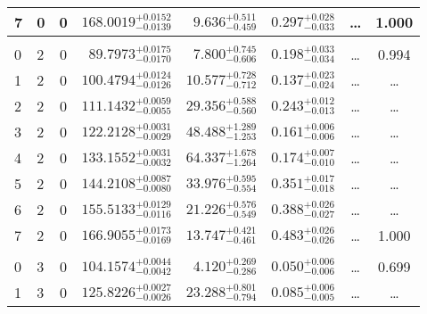 \begin{table*}[!]
\begin{tabular}{llcrrlrc}
7 & 0 & 0 & $    168.0019_{-      0.0139}^{+      0.0152}$ & $       9.636_{-       0.459}^{+       0.511}$ & $       0.297_{-       0.033}^{+       0.028}$ & \multicolumn{1}{c}{\dots} & 1.000\\[1pt]
\hline \\[-8pt]
0 & 2 & 0 & $     89.7973_{-      0.0170}^{+      0.0175}$ & $       7.800_{-       0.606}^{+       0.745}$ & $       0.198_{-       0.034}^{+       0.033}$ & \multicolumn{1}{c}{\dots} & 0.994\\[1pt]
1 & 2 & 0 & $    100.4794_{-      0.0126}^{+      0.0124}$ & $      10.577_{-       0.712}^{+       0.728}$ & $       0.137_{-       0.024}^{+       0.023}$ & \multicolumn{1}{c}{\dots} & \dots\\[1pt]
2 & 2 & 0 & $    111.1432_{-      0.0055}^{+      0.0059}$ & $      29.356_{-       0.560}^{+       0.588}$ & $       0.243_{-       0.013}^{+       0.012}$ & \multicolumn{1}{c}{\dots} & \dots\\[1pt]
3 & 2 & 0 & $    122.2128_{-      0.0029}^{+      0.0031}$ & $      48.488_{-       1.253}^{+       1.289}$ & $       0.161_{-       0.006}^{+       0.006}$ & \multicolumn{1}{c}{\dots} & \dots \\[1pt]
4 & 2 & 0 & $    133.1552_{-      0.0032}^{+      0.0031}$ & $      64.337_{-       1.264}^{+       1.678}$ & $       0.174_{-       0.010}^{+       0.007}$ & \multicolumn{1}{c}{\dots} & \dots \\[1pt]
5 & 2 & 0 & $    144.2108_{-      0.0080}^{+      0.0087}$ & $      33.976_{-       0.554}^{+       0.595}$ & $       0.351_{-       0.018}^{+       0.017}$ & \multicolumn{1}{c}{\dots} & \dots \\[1pt]
6 & 2 & 0 & $    155.5133_{-      0.0116}^{+      0.0129}$ & $      21.226_{-       0.549}^{+       0.576}$ & $       0.388_{-       0.027}^{+       0.026}$ & \multicolumn{1}{c}{\dots} & \dots \\[1pt]
7 & 2 & 0 & $    166.9055_{-      0.0169}^{+      0.0173}$ & $      13.747_{-       0.461}^{+       0.421}$ & $       0.483_{-       0.026}^{+       0.026}$ & \multicolumn{1}{c}{\dots} & 1.000\\[1pt]
\hline \\[-8pt]
0 & 3 & 0 & $    104.1574_{-      0.0042}^{+      0.0044}$ & $       4.120_{-       0.286}^{+       0.269}$ & $       0.050_{-       0.006}^{+       0.006}$ & \multicolumn{1}{c}{\dots} & 0.699\\[1pt]
1 & 3 & 0 & $    125.8226_{-      0.0026}^{+      0.0027}$ & $      23.288_{-       0.794}^{+       0.801}$ & $       0.085_{-       0.005}^{+       0.006}$ & \multicolumn{1}{c}{\dots} & \dots \\[1pt]

\end{tabular}
\end{table*}

